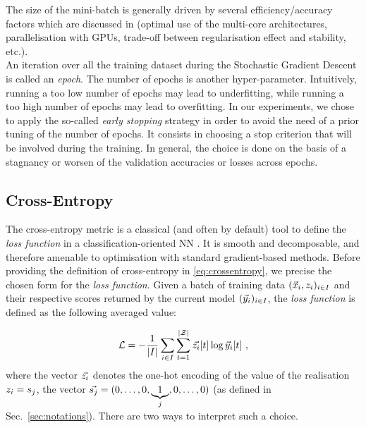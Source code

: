 The size of the mini-batch is generally
driven by several efficiency/accuracy factors which are \eg discussed in
\cite{GBC16} (\eg optimal use of the multi-core architectures, parallelisation
with GPUs, trade-off between regularisation effect and stability, etc.). \\

An iteration over all the training dataset during the Stochastic Gradient Descent is called an \emph{epoch}.
The number of epochs is another hyper-parameter. Intuitively, running a too low number of epochs may lead to underfitting, while running a too high number of epochs may lead to overfitting. In our experiments, we chose to apply the so-called \emph{early stopping} strategy \cite{Prechelt2012}  in order to avoid the need of a prior tuning of the number of epochs. It consists in choosing a stop criterion that will be involved during the training. In general, the choice is done on the basis of a stagnancy or  worsen of the validation accuracies or losses across epochs.\\

\subsection{Cross-Entropy}
The cross-entropy
metric is a classical (and often by default) tool to define the \emph{loss function} in a classification-oriented NN \cite{LCH05,Goodfellow-et-al-2016}. It is smooth and
decomposable, and therefore amenable to optimisation with standard
gradient-based methods. Before providing the definition of cross-entropy in \eqref{eq:crossentropy}, we precise the chosen form for the \emph{loss function}. Given a batch of training data $(\vec{x}_i, z_i)_{i\in I}$ and their respective scores returned by the current model $(\vec{y}_i)_{i\in I}$, the \emph{loss function} is defined as the following averaged value:

\begin{equation}\label{eq:lossfunction}
\mathcal{L} = -\frac{1}{\lvert I \rvert} \sum_{i\in I} \sum_{t=1}^{|\mathcal{Z}|}\vec{z_i}[t]\log{\ensuremath {\vec{y}}_i[t]} \mbox{ ,}
\end{equation}   
where the vector $\vec{z_i}$ denotes the one-hot encoding of the value of the realisation $z_i=s_{j}$, \ie the vector $\vec{s_{j}} = (0,\ldots , 0,\underbrace{1}_{j},0,\dots,0)$ (as defined in Sec.~\ref{sec:notations}).
There are two ways to interpret such a choice. 

